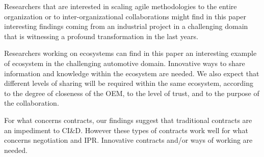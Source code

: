Researchers that are interested in scaling agile methodologies to the entire organization or to inter-organizational collaborations might find in this paper interesting findings coming from an industrial project in a challenging domain that is witnessing a profound transformation in the last years. 

Researchers working on ecosystems can find in this paper an interesting example of ecosystem in the challenging automotive domain. Innovative ways to share information and knowledge within the ecosystem are needed. %
We also expect that different levels of sharing will be required within the same ecosystem, according to the degree of closeness of the OEM, to the level of trust, and to the purpose of the collaboration.

For what concerns contracts, our findings suggest that traditional contracts are an impediment to  CI\&D. However these types of contracts work well for what concerns negotiation and IPR. Innovative contracts and/or ways of working are needed.

% 






